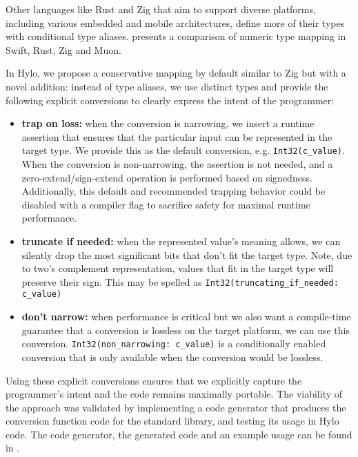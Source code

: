 Other languages like Rust and Zig that aim to support diverse platforms, including various embedded and mobile architectures, define more of their types with conditional type aliases.  presents a comparison of numeric type mapping in Swift, Rust, Zig and Muon.

In Hylo, we propose a conservative mapping by default similar to Zig but with a novel addition: instead of type aliases, we use distinct types and provide the following explicit conversions to clearly express the intent of the programmer:
\begin{itemize}
    \item \textbf{trap on loss:} when the conversion is narrowing, we insert a runtime assertion that ensures that the particular input can be represented in the target type. We provide this as the default conversion, e.g. \texttt{Int32(c\_value)}. When the conversion is non-narrowing, the assertion is not needed, and a zero-extend/sign-extend operation is performed based on signedness. Additionally, this default and recommended trapping behavior could be disabled with a compiler flag to sacrifice safety for maximal runtime performance.
    \item \textbf{truncate if needed:} when the represented value's meaning allows, we can silently drop the most significant bits that don't fit the target type. Note, due to two's complement representation, values that fit in the target type will preserve their sign. This may be spelled as \texttt{Int32(truncating\_if\_needed: c\_value)}
    \item \textbf{don't narrow:} when performance is critical but we also want a compile-time guarantee that a conversion is lossless on the target platform, we can use this conversion. \texttt{Int32(non\_narrowing: c\_value)} is a conditionally enabled conversion that is only available when the conversion would be lossless.
\end{itemize}
Using these explicit conversions ensures that we explicitly capture the programmer's intent and the code remains maximally portable. The viability of the approach was validated by implementing a code generator that produces the conversion function code for the standard library, and testing its usage in Hylo code. The code generator, the generated code and an example usage can be found in \cite{hylo-c-mappings-and-c-integers}.

